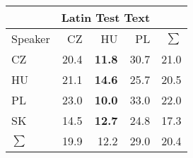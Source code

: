 \begin{tabular}{l|rrr|r}
\hline
 & \multicolumn{3}{c}{Latin Test Text} & \\
\hline
 Speaker   &   CZ &   HU &   PL &   $\sum$ \\
\hline
CZ        & 20.4 & \bf{11.8} & 30.7 &     21.0 \\
HU        & 21.1 & \bf{14.6} & 25.7 &     20.5 \\
PL        & 23.0 & \bf{10.0} & 33.0 &     22.0 \\
SK        & 14.5 & \bf{12.7} & 24.8 &     17.3 \\
\hline
 $\sum$   & 19.9 & 12.2 & 29.0 &     20.4 \\
\hline
\end{tabular}
